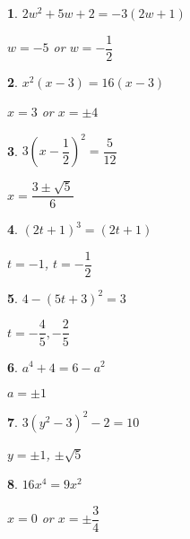 \documentclass{amsbook}
\newtheorem{exc}{}
\newenvironment{ex}{\begin{exc}\normalfont}{\end{exc}}
\numberwithin{section}{chapter}
\numberwithin{equation}{chapter}
\begin{document}
\begin{multicols}{2}
\begin{ex}
	 $2w^2 + 5w + 2 = - 3(2w+1)$
	\begin{sol}
	$w=-5$ or $w = -\dfrac{1}{2}$	
	\end{sol}
\end{ex}
\begin{ex}
	$x^2(x-3) = 16(x-3)$
	\begin{sol}
		$x=3$ or $x = \pm 4$
	\end{sol}
\end{ex}
\begin{ex}
	 $3\left(x - \dfrac{1}{2}\right)^2 = \dfrac{5}{12}$
	\begin{sol}
		$x = \dfrac{3 \pm \sqrt{5}}{6}$
	\end{sol}
\end{ex}
\begin{ex}
	$(2t+1)^3 = (2t+1)$
	\begin{sol}
		$t = -1$, $t= -\dfrac{1}{2}$
	\end{sol}
\end{ex}
\begin{ex}
	$4 - (5t+3)^2 = 3$
	\begin{sol}
		$t = -\dfrac{4}{5}, -\dfrac{2}{5}$
	\end{sol}
\end{ex}
\begin{ex}
	$a^4 + 4 = 6 - a^2$
	\begin{sol}
		$a = \pm 1$
	\end{sol}
\end{ex}
\begin{ex}
	$3(y^2-3)^2-2 = 10$
	\begin{sol}
		$y = \pm 1$, $\pm \sqrt{5}$
	\end{sol}
\end{ex}

\begin{ex}
	$16x^4 = 9x^2$
	\begin{sol}
		$x = 0$ or $x = \pm \dfrac{3}{4}$ 
	\end{sol}
\end{ex}


\end{multicols}
\end{document}
